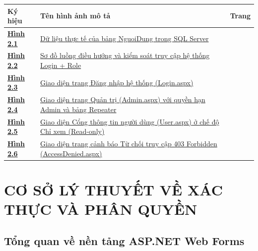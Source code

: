 \documentclass[12pt,a4paper]{report}
\begin{document}
\begin{center}
\renewcommand{\arraystretch}{1.25}
\begin{tabularx}{\textwidth}{>{\raggedright\arraybackslash}p{2.5cm} >{\raggedright\arraybackslash}X >{\raggedleft\arraybackslash}p{2.0cm}}
\toprule
\textbf{Ký hiệu} & \textbf{Tên hình ảnh mô tả} & \textbf{Trang} \\
\midrule
\hyperref[fig:csdl_nguoidung]{\textbf{Hình 2.1}} & \hyperref[fig:csdl_nguoidung]{Dữ liệu thực tế của bảng NguoiDung trong SQL Server} & \pageref{fig:csdl_nguoidung} \\
\addlinespace
\hyperref[fig:so_do_dieu_huong]{\textbf{Hình 2.2}} & \hyperref[fig:so_do_dieu_huong]{Sơ đồ luồng điều hướng và kiểm soát truy cập hệ thống Login + Role} & \pageref{fig:so_do_dieu_huong} \\
\addlinespace
\hyperref[fig:ui_login]{\textbf{Hình 2.3}} & \hyperref[fig:ui_login]{Giao diện trang Đăng nhập hệ thống (Login.aspx)} & \pageref{fig:ui_login} \\
\addlinespace
\hyperref[fig:ui_admin]{\textbf{Hình 2.4}} & \hyperref[fig:ui_admin]{Giao diện trang Quản trị (Admin.aspx) với quyền hạn Admin và bảng Repeater} & \pageref{fig:ui_admin} \\
\addlinespace
\hyperref[fig:ui_user]{\textbf{Hình 2.5}} & \hyperref[fig:ui_user]{Giao diện Cổng thông tin người dùng (User.aspx) ở chế độ Chỉ xem (Read-only)} & \pageref{fig:ui_user} \\
\addlinespace
\hyperref[fig:ui_accessdenied]{\textbf{Hình 2.6}} & \hyperref[fig:ui_accessdenied]{Giao diện trang cảnh báo Từ chối truy cập 403 Forbidden (AccessDenied.aspx)} & \pageref{fig:ui_accessdenied} \\
\bottomrule
\end{tabularx}
\end{center}
\newpage



\setcounter{page}{1}

\chapter{CƠ SỞ LÝ THUYẾT VỀ XÁC THỰC VÀ PHÂN QUYỀN}

\section{Tổng quan về nền tảng ASP.NET Web Forms}
\end{document}

